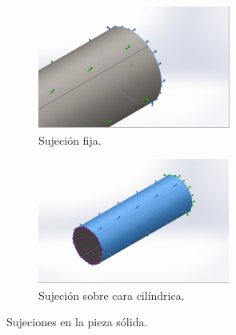 \documentclass[12pt, letterpaper]{article}
\begin{document}
\begin{figure}[H]
	\centering
	\begin{subfigure}[b]{0.49\linewidth}
		\includegraphics[width=\linewidth]{suj1.png}
		\caption{Sujeción fija.}
	\end{subfigure}
	\begin{subfigure}[b]{0.49\linewidth}
		\includegraphics[width=\linewidth]{suj2.png}
		\caption{Sujeción sobre cara cilíndrica.}
	\end{subfigure}
	\caption{Sujeciones en la pieza sólida.}
\end{figure}
\end{document}
